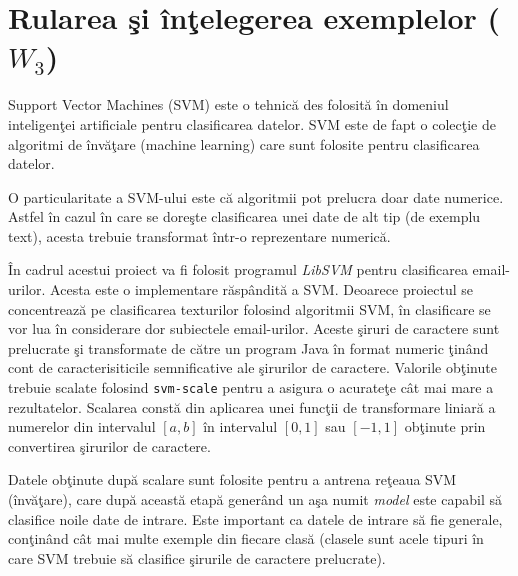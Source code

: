 \documentclass[a4paper,12pt]{report}
\begin{document}
  

  
  
  
  



\chapter{Rularea \c si \^in\c telegerea exemplelor ($W_3$)}

  \par
  Support Vector Machines (SVM) este o tehnic\u a des folosit\u a \^in domeniul inteligen\c tei artificiale
  pentru clasificarea datelor. SVM este de fapt o colec\c tie de algoritmi de \^inv\u a\c tare
  (machine learning) care sunt folosite pentru clasificarea datelor.
  
  \par
  O particularitate a SVM-ului este c\u a algoritmii pot prelucra doar date numerice. Astfel \^in cazul \^in care
  se dore\c ste clasificarea unei date de alt tip (de exemplu text), acesta trebuie 
  transformat \^intr-o reprezentare numeric\u a.
  
  \par
  \^In cadrul acestui proiect va fi folosit programul \textit{LibSVM} pentru clasificarea email-urilor. 
  Acesta este o implementare r\u asp\^andit\u a a SVM.
  Deoarece proiectul se concentreaz\u a pe clasificarea texturilor folosind algoritmii SVM, \^in clasificare se vor
  lua \^in considerare dor subiectele email-urilor. Aceste \c siruri de caractere sunt prelucrate \c si transformate
  de c\u atre un program Java \^in format numeric \c tin\^and cont de caracterisiticile semnificative ale \c sirurilor de 
  caractere. Valorile ob\c tinute trebuie scalate folosind \verb+svm-scale+
  pentru a asigura o acurate\c te c\^ at mai mare a rezultatelor. Scalarea const\u a din aplicarea unei func\c tii 
  de transformare liniar\u a
  a numerelor din intervalul $[a,b]$ \^in intervalul $[0,1]$ sau $[-1,1]$ ob\c tinute prin 
  convertirea \c sirurilor de caractere.
  
  \par 
  Datele ob\c tinute dup\u a scalare sunt folosite pentru a antrena re\c teaua SVM (\^inv\u a\c tare), 
  care dup\u a aceast\u a 
  etap\u a gener\^and un a\c sa numit \textit{model} este capabil s\u a clasifice noile date de intrare. Este important ca datele de
  intrare s\u a fie generale, con\c tin\^and c\^at mai multe exemple din fiecare clas\u a (clasele sunt acele tipuri \^in 
  care SVM trebuie s\u a clasifice \c sirurile de caractere prelucrate).
  
\end{document}
